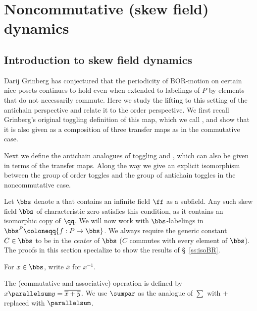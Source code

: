 \section{Noncommutative (skew field) dynamics}\label{sec:noncommutative}

\subsection{Introduction to skew field dynamics}

Darij Grinberg has conjectured that the periodicity of BOR-motion on certain nice posets
continues to hold even when extended to labelings of $P$ by elements that do not
necessarily commute. Here we study the lifting to this setting of the
antichain perspective and relate it to the order perspective. We first recall Grinberg's original toggling definition of this map, which we call , and show that it is also given as a composition of three transfer maps as in the commutative case. 

Next we define the antichain analogues of toggling and , which can also be given in terms of the transfer maps. Along the way we give an explicit isomorphism between the group of order toggles and the group of antichain toggles in the noncommutative case. 


Let $\bbs$ denote a  that contains an infinite field $\ff$ as a
subfield. Any such skew field $\bbs$ of characteristic zero satisfies this condition, as it contains an isomorphic copy of $\qq$.
We will now work with $\bbs$-labelings in $\bbs^P\coloneqq \{f:P\rightarrow \bbs \}$.
We always require the generic constant $C\in \bbs$ to be in the
\emph{center} of $\bbs$ (\ie $C$ commutes with every element of $\bbs$). The proofs in
this section specialize to show the results of \S~\ref{ss:isoBR}. 

\begin{nota}
For $x\in\bbs$, write $\overline{x}$ for $x^{-1}$.
\end{nota}

\begin{nota}
The (commutative and associative) operation  is defined by $x\parallelsum y=\overline{\overline{x}+\overline{y}}$.
We use $\sumpar$ as the analogue of $\sum$ with $+$ replaced with $\parallelsum$.
\end{nota}

